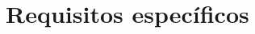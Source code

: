 \documentclass[
11pt, %
codirector, %
]{charter}
\begin{document}
\section{Requisitos específicos}
\label{sec:org40573d1}


%
%
%
%
%
%
%
%
%
\end{document}
